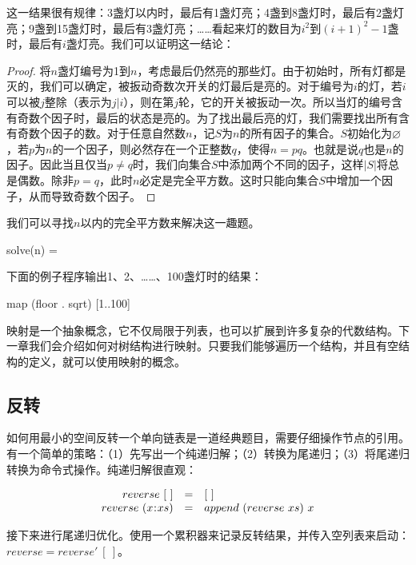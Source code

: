 \documentclass[b5paper]{ctexart}
\begin{document}
这一结果很有规律：3盏灯以内时，最后有1盏灯亮；4盏到8盏灯时，最后有2盏灯亮；9盏到15盏灯时，最后有3盏灯亮；……看起来灯的数目为$i^2$到$(i+1)^2-1$盏时，最后有$i$盏灯亮。我们可以证明这一结论：

\begin{proof}
将$n$盏灯编号为1到$n$，考虑最后仍然亮的那些灯。由于初始时，所有灯都是灭的，我们可以确定，被扳动奇数次开关的灯最后是亮的。对于编号为$i$的灯，若$i$可以被$j$整除（表示为$j | i$），则在第$j$轮，它的开关被扳动一次。所以当灯的编号含有奇数个因子时，最后的状态是亮的。为了找出最后亮的灯，我们需要找出所有含有奇数个因子的数。对于任意自然数$n$，记$S$为$n$的所有因子的集合。$S$初始化为$\varnothing$，若$p$为$n$的一个因子，则必然存在一个正整数$q$，使得$n = p q$。也就是说$q$也是$n$的因子。因此当且仅当$p \neq q$时，我们向集合$S$中添加两个不同的因子，这样$|S|$将总是偶数。除非$p = q$，此时$n$必定是完全平方数。这时只能向集合$S$中增加一个因子，从而导致奇数个因子。
\end{proof}

我们可以寻找$n$以内的完全平方数来解决这一趣题。

\be
solve(n) = \lfloor {} \rfloor
\ee

下面的例子程序输出1、2、……、100盏灯时的结果：

\begin{Haskell}
map (floor . sqrt) [1..100]
\end{Haskell}

映射是一个抽象概念，它不仅局限于列表，也可以扩展到许多复杂的代数结构。下一章我们会介绍如何对树结构进行映射。只要我们能够遍历一个结构，并且有空结构的定义，就可以使用映射的概念。

\subsection{反转}
\label{subsec:reverse}


如何用最小的空间反转一个单向链表是一道经典题目，需要仔细操作节点的引用。有一个简单的策略：（1）先写出一个纯递归解；（2）转换为尾递归；（3）将尾递归转换为命令式操作。纯递归解很直观：

\[
\begin{array}{rcl}
reverse\ [\ ] & = & [\ ] \\
reverse\ (x \mathbin{\!:\!} xs) & = & append\ (reverse\ xs)\ x \\
\end{array}
\]

接下来进行尾递归优化。使用一个累积器来记录反转结果，并传入空列表来启动：$reverse = reverse'\ [\ ]$。
\end{document}
